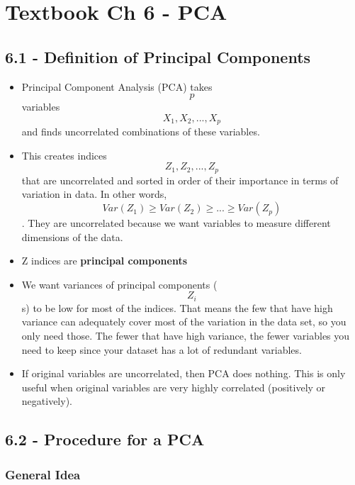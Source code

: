 \documentclass[]{article}
\providecommand{\tightlist}{%
  \setlength{\itemsep}{0pt}\setlength{\parskip}{0pt}}
\begin{document}
\hypertarget{textbook-ch-6---pca}{%
\section{Textbook Ch 6 - PCA}\label{textbook-ch-6---pca}}

\hypertarget{definition-of-principal-components}{%
\subsection{6.1 - Definition of Principal
Components}\label{definition-of-principal-components}}

\begin{itemize}
\tightlist
\item
  Principal Component Analysis (PCA) takes \[p\] variables
  \[X_1, X_2, ..., X_p\]and finds uncorrelated combinations of these
  variables.
\item
  This creates indices \[Z_1, Z_2, ..., Z_p\]that are uncorrelated and
  sorted in order of their importance in terms of variation in data. In
  other words, \[Var(Z_1) \ge Var(Z_2) \ge ... \ge Var(Z_p)\]. They are
  uncorrelated because we want variables to measure different dimensions
  of the data.
\item
  Z indices are \textbf{principal components}
\item
  We want variances of principal components (\[Z_i\]s) to be low for
  most of the indices. That means the few that have high variance can
  adequately cover most of the variation in the data set, so you only
  need those. The fewer that have high variance, the fewer variables you
  need to keep since your dataset has a lot of redundant variables.
\item
  If original variables are uncorrelated, then PCA does nothing. This is
  only useful when original variables are very highly correlated
  (positively or negatively).
\end{itemize}

\hypertarget{procedure-for-a-pca}{%
\subsection{6.2 - Procedure for a PCA}\label{procedure-for-a-pca}}

\hypertarget{general-idea}{%
\subsubsection{General Idea}\label{general-idea}}
\end{document}
